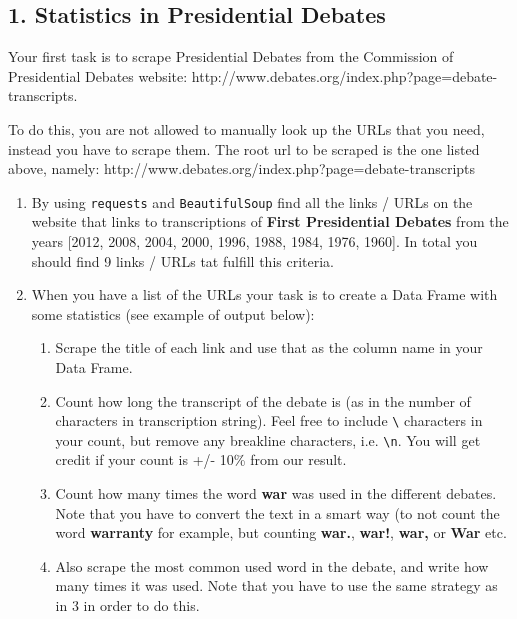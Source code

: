 \documentclass[11pt]{article}
\providecommand{\tightlist}{%
      \setlength{\itemsep}{0pt}\setlength{\parskip}{0pt}}
\begin{document}
    \subsection{1. Statistics in Presidential
Debates}\label{statistics-in-presidential-debates}

Your first task is to scrape Presidential Debates from the Commission of
Presidential Debates website:
http://www.debates.org/index.php?page=debate-transcripts.

To do this, you are not allowed to manually look up the URLs that you
need, instead you have to scrape them. The root url to be scraped is the
one listed above, namely:
http://www.debates.org/index.php?page=debate-transcripts

\begin{enumerate}
\def\labelenumi{\arabic{enumi}.}
\tightlist
\item
  By using \texttt{requests} and \texttt{BeautifulSoup} find all the
  links / URLs on the website that links to transcriptions of
  \textbf{First Presidential Debates} from the years {[}2012, 2008,
  2004, 2000, 1996, 1988, 1984, 1976, 1960{]}. In total you should find
  9 links / URLs tat fulfill this criteria.
\item
  When you have a list of the URLs your task is to create a Data Frame
  with some statistics (see example of output below):

  \begin{enumerate}
  \def\labelenumii{\arabic{enumii}.}
  \tightlist
  \item
    Scrape the title of each link and use that as the column name in
    your Data Frame.
  \item
    Count how long the transcript of the debate is (as in the number of
    characters in transcription string). Feel free to include
    \texttt{\textbackslash{}} characters in your count, but remove any
    breakline characters, i.e. \texttt{\textbackslash{}n}. You will get
    credit if your count is +/- 10\% from our result.
  \item
    Count how many times the word \textbf{war} was used in the different
    debates. Note that you have to convert the text in a smart way (to
    not count the word \textbf{warranty} for example, but counting
    \textbf{war.}, \textbf{war!}, \textbf{war,} or \textbf{War} etc.
  \item
    Also scrape the most common used word in the debate, and write how
    many times it was used. Note that you have to use the same strategy
    as in 3 in order to do this.
  \end{enumerate}
\end{enumerate}
\end{document}
